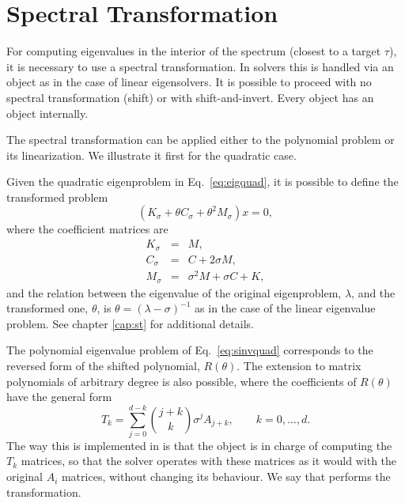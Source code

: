 \section{\label{sec:qst}Spectral Transformation}

For computing eigenvalues in the interior of the spectrum (closest to a target $\tau$), it is necessary to use a spectral transformation. In  solvers this is handled via an  object as in the case of linear eigensolvers. It is possible to proceed with no spectral transformation (shift) or with shift-and-invert. Every  object has an  object internally.

The spectral transformation can be applied either to the polynomial problem or its linearization. We illustrate it first for the quadratic case.

Given the quadratic eigenproblem in Eq.\ \ref{eq:eigquad}, it is possible to define the transformed problem
\begin{equation}
\label{eq:sinvquad}
(K_\sigma+\theta C_\sigma+\theta^2M_\sigma)x=0,
\end{equation}
where the coefficient matrices are
\begin{eqnarray}
K_\sigma&\!\!=\!\!&M,\\
C_\sigma&\!\!=\!\!&C+2\sigma M,\\
M_\sigma&\!\!=\!\!&\sigma^2 M+\sigma C+K,
\end{eqnarray}
and the relation between the eigenvalue of the original eigenproblem, $\lambda$, and the transformed one, $\theta$, is $\theta=(\lambda-\sigma)^{-1}$ as in the case of the linear eigenvalue problem. See chapter \ref{cap:st} for additional details.

The polynomial eigenvalue problem of Eq.\ \ref{eq:sinvquad} corresponds to the reversed form of the shifted polynomial, $R(\theta)$. The extension to matrix polynomials of arbitrary degree is also possible, where the coefficients of $R(\theta)$ have the general form
\begin{equation}
\label{eq:sinvpep}
T_k=\sum_{j=0}^{d-k}\binom{j+k}{k}\sigma^{j}A_{j+k},\qquad k=0,\ldots,d.
\end{equation}
The way this is implemented in \slepc is that the  object is in charge of computing the $T_k$ matrices, so that the  solver operates with these matrices as it would with the original $A_i$ matrices, without changing its behaviour. We say that  performs the transformation.

